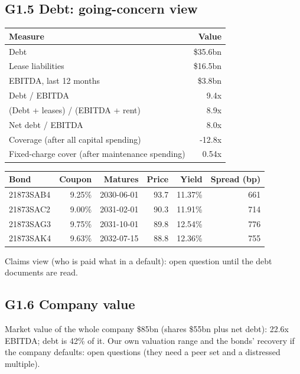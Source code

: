\documentclass[11pt,a4paper]{article}
\begin{document}
\subsection*{G1.5 Debt: going-concern view}
\begin{center}\footnotesize\setlength{\tabcolsep}{3.5pt}\begin{tabular}{@{}lr@{}}\toprule
Measure & Value \\\midrule
Debt & \$35.6bn \\
Lease liabilities & \$16.5bn \\
EBITDA, last 12 months & \$3.8bn \\
Debt / EBITDA & 9.4x \\
(Debt + leases) / (EBITDA + rent) & 8.9x \\
Net debt / EBITDA & 8.0x \\
Coverage (after all capital spending) & -12.8x \\
Fixed-charge cover (after maintenance spending) & 0.54x \\
\bottomrule\end{tabular}\end{center}
\begin{center}\footnotesize\setlength{\tabcolsep}{3.5pt}\begin{tabular}{@{}lrrrrr@{}}\toprule
Bond & Coupon & Matures & Price & Yield & Spread (bp) \\\midrule
21873SAB4 & 9.25\% & 2030-06-01 & 93.7 & 11.37\% & 661 \\
21873SAC2 & 9.00\% & 2031-02-01 & 90.3 & 11.91\% & 714 \\
21873SAG3 & 9.75\% & 2031-10-01 & 89.8 & 12.54\% & 776 \\
21873SAK4 & 9.63\% & 2032-07-15 & 88.8 & 12.36\% & 755 \\
\bottomrule\end{tabular}\end{center}
Claims view (who is paid what in a default): open question until the debt documents are read.
\subsection*{G1.6 Company value}
Market value of the whole company \$85bn (shares \$55bn plus net debt): 22.6x EBITDA; debt is 42\% of it. Our own valuation range and the bonds' recovery if the company defaults: open questions (they need a peer set and a distressed multiple).
\end{document}
